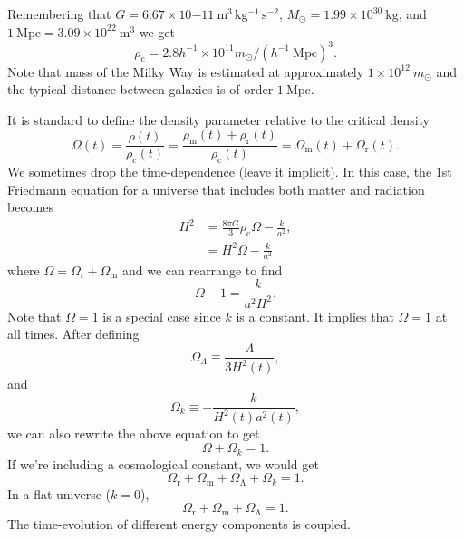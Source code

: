\documentclass[a4paper,12pt]{article}
\theoremstyle{remark}
\newcommand{\mrm}[1]{\mathrm{#1}}
\renewcommand{\=}[1]{\stackrel{#1}{=}} %
\theoremstyle{plain}
\theoremstyle{definition}
\begin{document}
Remembering that $G = 6.67 \times 10{-11} \:\mrm{m^{3} \, kg^{-1} \, s^{-2}}$, $M _\odot = 1.99 \times 10^{30} \:\mrm{kg}$, and $1\:\mrm{Mpc} = 3.09 \times 10^{22} \:\mrm{m^{3}}$ we get 
\begin{equation}
\rho _\mrm{c} = 2.8 h^{-1} \times 10^{11} m_\odot / (h^{-1} \:\mrm{Mpc} )^{3}.
\end{equation}
Note that mass of the Milky Way is estimated at approximately $1\times10^{12} \: m_\odot$ and the typical distance between galaxies is of order $1 \:\mrm{Mpc}$.

It is standard to define the density parameter relative to the critical density
\begin{equation}
\Omega (t) = \frac{\rho(t)}{\rho_\mrm{c} (t)} = \frac{\rho_\mrm{m}(t) + \rho_\mrm{r}(t)}{\rho_\mrm{c}(t)} = \Omega _\mrm{m}(t) + \Omega _\mrm{r}(t).
\end{equation}
We sometimes drop the time-dependence (leave it implicit). In this case, the 1st Friedmann equation for a universe that includes both matter and radiation becomes
\begin{align}
H^{2} &= \frac{8 \pi G}{3} \rho_\mrm{c} \Omega - \frac{k}{a^{2}}, \nonumber \\
&= H^2 \Omega - \frac{k}{a^{2}}
\end{align}
where $\Omega = \Omega _\mrm{r} + \Omega _\mrm{m}$ and we can rearrange to find
\begin{equation}
\Omega - 1 = \frac{k}{a^{2}H^{2}}.
\end{equation}
Note that $\Omega = 1$ is a special case since $k$ is a constant. It implies that $\Omega = 1$ at all times. After defining
\begin{equation}
\Omega _\Lambda \equiv \frac{\Lambda}{3H^{2}(t)},
\end{equation}
and
\begin{equation}
\Omega _k \equiv -\frac{k}{H^{2}(t)a^{2}(t)},
\end{equation}
we can also rewrite the above equation to get 
\begin{equation}
\Omega + \Omega _k = 1.
\end{equation}
If we're including a cosmological constant, we would get
\begin{equation}
\Omega _\mrm{r} + \Omega _\mrm{m} + \Omega _\mrm{\Lambda} + \Omega _k = 1.
\end{equation}
In a flat universe ($k=0$), 
\begin{equation}
\Omega _\mrm{r} + \Omega _\mrm{m} + \Omega _\mrm{\Lambda} = 1.
\end{equation}
The time-evolution of different energy components is coupled.
\end{document}
